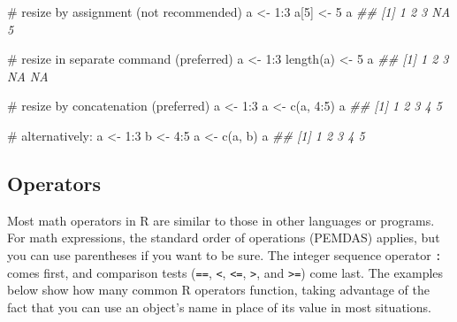 \documentclass[
  13,
  letterpaper,
]{report}
\newenvironment{Shaded}{\begin{snugshade}}{\end{snugshade}}
\newcommand{\CommentTok}[1]{\textcolor[rgb]{0.37,0.37,0.37}{#1}}
\newcommand{\DecValTok}[1]{\textcolor[rgb]{0.68,0.00,0.00}{#1}}
\newcommand{\DocumentationTok}[1]{\textcolor[rgb]{0.37,0.37,0.37}{\textit{#1}}}
\newcommand{\FunctionTok}[1]{\textcolor[rgb]{0.28,0.35,0.67}{#1}}
\newcommand{\NormalTok}[1]{\textcolor[rgb]{0.00,0.23,0.31}{#1}}
\newcommand{\OtherTok}[1]{\textcolor[rgb]{0.00,0.23,0.31}{#1}}
\newcommand{\SpecialCharTok}[1]{\textcolor[rgb]{0.37,0.37,0.37}{#1}}
\begin{document}
\begin{Shaded}
\begin{Highlighting}[]
\CommentTok{\# resize by assignment (not recommended)}
\NormalTok{a }\OtherTok{\textless{}{-}} \DecValTok{1}\SpecialCharTok{:}\DecValTok{3}
\NormalTok{a[}\DecValTok{5}\NormalTok{] }\OtherTok{\textless{}{-}} \DecValTok{5}
\NormalTok{a}
\DocumentationTok{\#\# [1]  1  2  3 NA  5}

\CommentTok{\# resize in separate command (preferred)}
\NormalTok{a }\OtherTok{\textless{}{-}} \DecValTok{1}\SpecialCharTok{:}\DecValTok{3}
\FunctionTok{length}\NormalTok{(a) }\OtherTok{\textless{}{-}} \DecValTok{5}
\NormalTok{a}
\DocumentationTok{\#\# [1]  1  2  3 NA NA}

\CommentTok{\# resize by concatenation (preferred)}
\NormalTok{a }\OtherTok{\textless{}{-}} \DecValTok{1}\SpecialCharTok{:}\DecValTok{3}
\NormalTok{a }\OtherTok{\textless{}{-}} \FunctionTok{c}\NormalTok{(a, }\DecValTok{4}\SpecialCharTok{:}\DecValTok{5}\NormalTok{)}
\NormalTok{a}
\DocumentationTok{\#\# [1] 1 2 3 4 5}

\CommentTok{\# alternatively:}
\NormalTok{a }\OtherTok{\textless{}{-}} \DecValTok{1}\SpecialCharTok{:}\DecValTok{3}
\NormalTok{b }\OtherTok{\textless{}{-}} \DecValTok{4}\SpecialCharTok{:}\DecValTok{5}
\NormalTok{a }\OtherTok{\textless{}{-}} \FunctionTok{c}\NormalTok{(a, b)}
\NormalTok{a}
\DocumentationTok{\#\# [1] 1 2 3 4 5}
\end{Highlighting}
\end{Shaded}

\subsection{Operators}\label{sec-r-syn-ops}

Most math operators in R are similar to those in other languages or
programs. For math expressions, the standard order of operations
(PEMDAS) applies, but you can use parentheses if you want to be sure.
The integer sequence operator \texttt{:} comes first, and comparison
tests (\texttt{==}, \texttt{\textless{}}, \texttt{\textless{}=},
\texttt{\textgreater{}}, and \texttt{\textgreater{}=}) come last. The
examples below show how many common R operators function, taking
advantage of the fact that you can use an object's name in place of its
value in most situations.
\end{document}
